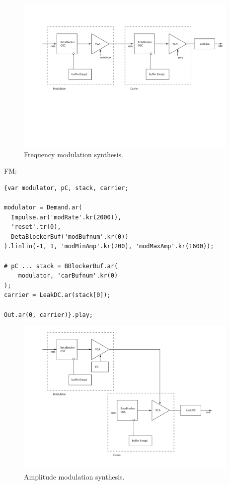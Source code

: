 \documentclass[letterpaper, 12pt]{article}
\begin{document}
\begin{figure}
	\centering
		\includegraphics[height=3in]{FM-Betablocker}
	\caption{Frequency modulation synthesis.}
	\label{fig:fig_FM-Betablocker}
\end{figure}

FM:
\begin{Verbatim}[fontfamily=courier, xleftmargin=\parindent]
{var modulator, pC, stack, carrier;

modulator = Demand.ar(
  Impulse.ar('modRate'.kr(2000)), 
  'reset'.tr(0),
  DetaBlockerBuf('modBufnum'.kr(0))
).linlin(-1, 1, 'modMinAmp'.kr(200), 'modMaxAmp'.kr(1600));

# pC ... stack = BBlockerBuf.ar(
	modulator, 'carBufnum'.kr(0)
);
carrier = LeakDC.ar(stack[0]);

Out.ar(0, carrier)}.play;
\end{Verbatim}


\begin{figure}
	\centering
		\includegraphics[height=3in]{AM-Betablocker}
	\caption{Amplitude modulation synthesis.}
	\label{fig:fig_AM-Betablocker}
\end{figure}
\end{document}
